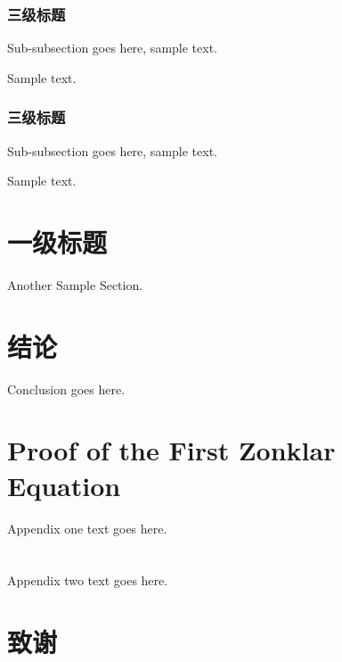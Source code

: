 \documentclass[12pt,journal,onecolumn]{IEEEtran}
\begin{document}
\subsubsection{三级标题}

Sub-subsection goes here, sample text.

Sample text.

\subsubsection{三级标题}

Sub-subsection goes here, sample text.

Sample text.

\section{一级标题}

Another Sample Section.

\section{结论}

Conclusion goes here.

\patchcmd{\section}{\raggedright}{\centering}{}{}
\patchcmd{\section}{\normalsize}{\large\bfseries}{}{}

\appendices
\section{Proof of the First Zonklar Equation}
Appendix one text goes here.

\section{}
Appendix two text goes here.


\section*{致谢}
\end{document}
